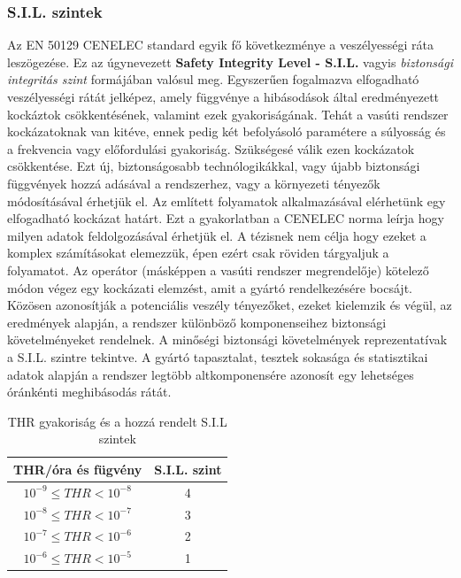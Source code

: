 \documentclass[a4paper,12pt]{article}
\begin{document}
\subsubsection{S.I.L. szintek}
Az EN 50129 CENELEC standard egyik fő következménye a veszélyességi ráta leszögezése.
Ez az úgynevezett \textbf{Safety Integrity Level - S.I.L.} vagyis \textit{biztonsági integritás szint} formájában valósul meg.
Egyszerűen fogalmazva elfogadható veszélyességi rátát jelképez, amely függvénye a hibásodások által eredményezett kockáztok csökkentésének, valamint ezek gyakoriságának.
Tehát a vasúti rendszer kockázatoknak van kitéve, ennek pedig két befolyásoló paramétere a súlyosság és a frekvencia vagy előfordulási gyakoriság.
Szükségesé válik ezen kockázatok csökkentése. Ezt új, biztonságosabb technólogikákkal, vagy újabb biztonsági függvények hozzá adásával a rendszerhez, vagy a környezeti tényezők módosításával érhetjük el.
Az említett folyamatok alkalmazásával elérhetünk egy elfogadható kockázat határt.
Ezt a gyakorlatban a CENELEC norma leírja hogy milyen adatok feldolgozásával érhetjük el. 
A tézisnek nem célja hogy ezeket a komplex számításokat elemezzük, épen ezért csak röviden tárgyaljuk a folyamatot.
Az operátor (másképpen a vasúti rendszer megrendelője) kötelező módon végez egy kockázati elemzést, amit a gyártó rendelkezésére bocsájt.
Közösen azonosítják a potenciális veszély tényezőket, ezeket kielemzik és végül, az eredmények alapján, a rendszer különböző komponenseihez biztonsági követelményeket rendelnek.
A minőségi biztonsági követelmények reprezentatívak a S.I.L. szintre tekintve.
A gyártó tapasztalat, tesztek sokasága és statisztikai adatok alapján a rendszer legtöbb altkomponensére azonosít egy lehetséges óránkénti meghibásodás rátát.

\begin{table}[!htbp]
    \centering
    \begin{tabular}{|c|c|}\hline
        THR/óra és fügvény & S.I.L. szint \\ \hline
        $10^{-9} \leq THR < 10^{-8}$ & 4 \\ \hline
        $10^{-8} \leq THR < 10^{-7}$ & 3  \\ \hline
        $10^{-7} \leq THR < 10^{-6}$ & 2 \\ \hline
        $10^{-6} \leq THR < 10^{-5}$ & 1 \\ \hline
    \end{tabular}
    \caption[S.I.L szintek]{THR gyakoriság és a hozzá rendelt S.I.L szintek}
    \label{sil_levels}
\end{table}
\end{document}
